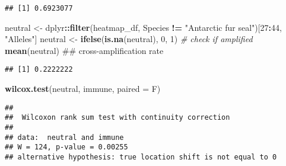 \documentclass[]{article}
\newenvironment{Shaded}{\begin{snugshade}}{\end{snugshade}}
\newcommand{\KeywordTok}[1]{\textcolor[rgb]{0.13,0.29,0.53}{\textbf{#1}}}
\newcommand{\DataTypeTok}[1]{\textcolor[rgb]{0.13,0.29,0.53}{#1}}
\newcommand{\DecValTok}[1]{\textcolor[rgb]{0.00,0.00,0.81}{#1}}
\newcommand{\StringTok}[1]{\textcolor[rgb]{0.31,0.60,0.02}{#1}}
\newcommand{\CommentTok}[1]{\textcolor[rgb]{0.56,0.35,0.01}{\textit{#1}}}
\newcommand{\OperatorTok}[1]{\textcolor[rgb]{0.81,0.36,0.00}{\textbf{#1}}}
\newcommand{\NormalTok}[1]{#1}
\begin{document}
\begin{verbatim}
## [1] 0.6923077
\end{verbatim}

\begin{Shaded}
\begin{Highlighting}[]
\NormalTok{neutral <-}\StringTok{ }\NormalTok{dplyr}\OperatorTok{::}\KeywordTok{filter}\NormalTok{(heatmap_df, Species }\OperatorTok{!=}\StringTok{ "Antarctic fur seal"}\NormalTok{)[}\DecValTok{27}\OperatorTok{:}\DecValTok{44}\NormalTok{, }\StringTok{"Alleles"}\NormalTok{]}
\NormalTok{neutral <-}\StringTok{ }\KeywordTok{ifelse}\NormalTok{(}\KeywordTok{is.na}\NormalTok{(neutral), }\DecValTok{0}\NormalTok{, }\DecValTok{1}\NormalTok{) }\CommentTok{# check if amplified }
\KeywordTok{mean}\NormalTok{(neutral) ## cross-amplification rate}
\end{Highlighting}
\end{Shaded}

\begin{verbatim}
## [1] 0.2222222
\end{verbatim}

\begin{Shaded}
\begin{Highlighting}[]
\KeywordTok{wilcox.test}\NormalTok{(neutral, immune, }\DataTypeTok{paired =}\NormalTok{ F)}
\end{Highlighting}
\end{Shaded}

\begin{verbatim}
## 
##  Wilcoxon rank sum test with continuity correction
## 
## data:  neutral and immune
## W = 124, p-value = 0.00255
## alternative hypothesis: true location shift is not equal to 0
\end{verbatim}
\end{document}
